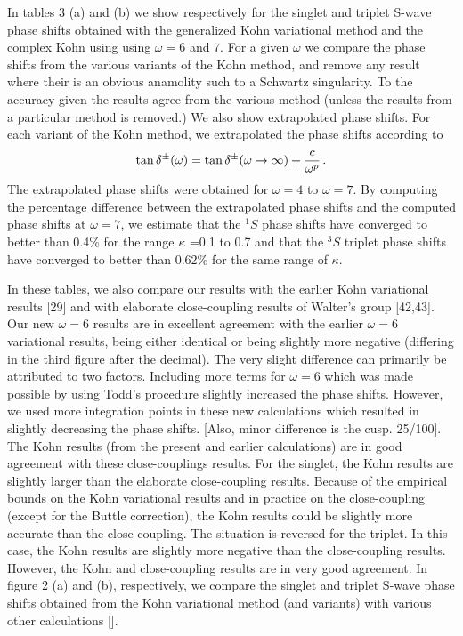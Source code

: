 \documentclass[preprint,showpacs,preprintnumbers,amsmath,amssymb]{revtex4}
\def \bea{\begin{eqnarray}}
\def\eea{\end{eqnarray}}
\begin{document}
In tables 3 (a) and (b) we show respectively for the singlet
and triplet S-wave phase shifts 
obtained with the generalized Kohn variational
method and the complex Kohn using using $\omega=6$ and 7.
For a given $\omega$ we compare the phase shifts from
the various variants of the Kohn method,
and remove any result where their is an obvious
anamolity such to a Schwartz singularity.
To the accuracy given the results agree from
the various method (unless the results
from  a particular method is removed.)
We also show extrapolated phase shifts.
For each variant of the Kohn method,
we extrapolated the phase shifts according
to 
\bea
\tan\delta^\pm(\omega) = \tan\delta^\pm(\omega\to\infty) + {c\over \omega^p}\, .
\eea
The extrapolated phase shifts were obtained for
$\omega=4$ to $\omega =7$.
By computing the percentage difference between the extrapolated phase shifts
and the computed phase shifts at $\omega =7$, we estimate
that the $^1S$ phase shifts have converged to better than 0.4\%
for the range $\kappa$ =0.1 to 0.7 and that the $^3S$ triplet
phase shifts have converged to better than 0.62\%
for the same range of $\kappa$.


In these tables, we also compare our results with the earlier Kohn
variational results [29] and with  elaborate
close-coupling results of Walter's group [42,43].
Our new $\omega=6$ results are in excellent agreement with 
the earlier $\omega =6$ variational results, being either identical or 
being  slightly more negative (differing in the third figure after
the decimal). 
The very slight difference can primarily
be attributed to two factors.
Including more terms for $\omega=6$ which was made possible
by using Todd's procedure slightly increased the phase shifts.
However, we used more integration points in these new
calculations which resulted in slightly decreasing
the phase shifts.
[Also, minor difference is the cusp. 25/100].
The Kohn results (from the present and earlier calculations) 
are in good agreement with these close-couplings results.
For the singlet, the Kohn results are slightly
larger than the elaborate close-coupling results.
Because of the empirical bounds on the
Kohn variational results and in practice on
the close-coupling (except for the Buttle
correction), the Kohn results could be
slightly more accurate than the close-coupling.
The situation is reversed for the triplet.
In this case, the Kohn results are slightly
more negative than the close-coupling results.
However, the Kohn and close-coupling results are
in very good agreement.
In figure 2 (a) and (b), respectively,
we compare the singlet and triplet
S-wave phase shifts obtained from the Kohn variational
method (and variants)  with various other calculations [].
\end{document}
